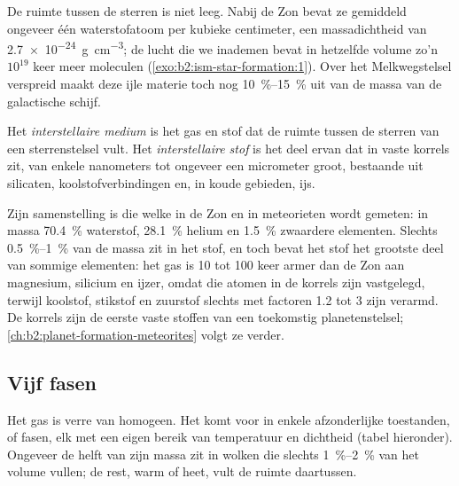 De ruimte tussen de sterren is niet leeg. Nabij de Zon bevat ze gemiddeld ongeveer
één waterstofatoom per kubieke centimeter, een massadichtheid van
\qty{2.7e-24}{g.cm^{-3}}; de lucht die we inademen bevat in hetzelfde volume zo'n $10^{19}$ keer meer
moleculen (\cref{exo:b2:ism-star-formation:1}). Over het Melkwegstelsel verspreid maakt deze ijle
materie toch nog \qtyrange{10}{15}{\percent} uit van de massa van de
galactische schijf.

\begin{definition}
\label{def:b2:ism-star-formation:ism}
Het \emph{interstellaire medium} is het gas en stof
dat de ruimte tussen de sterren van een sterrenstelsel vult. Het \emph{interstellaire
stof} is het deel ervan dat in vaste korrels zit, van enkele
nanometers tot ongeveer een micrometer groot, bestaande uit silicaten, koolstofverbindingen
en, in koude gebieden, ijs.
\end{definition}

Zijn samenstelling is die welke in de Zon en in meteorieten wordt gemeten: in massa
\qty{70.4}{\percent} waterstof, \qty{28.1}{\percent} helium en
\qty{1.5}{\percent} zwaardere elementen. Slechts \qtyrange{0.5}{1}{\percent} van de
massa zit in het stof, en toch bevat het stof het grootste deel van sommige elementen: het gas is
10 tot 100 keer armer dan de Zon aan magnesium, silicium en ijzer, omdat
die atomen in de korrels zijn vastgelegd, terwijl koolstof, stikstof en zuurstof
slechts met factoren 1.2 tot 3 zijn verarmd. De korrels zijn de eerste vaste stoffen van een
toekomstig planetenstelsel; \cref{ch:b2:planet-formation-meteorites}
volgt ze verder.

\subsection{Vijf fasen}

Het gas is verre van homogeen. Het komt voor in enkele afzonderlijke toestanden, of fasen,
elk met een eigen bereik van temperatuur en dichtheid (tabel hieronder). Ongeveer de helft
van zijn massa zit in wolken die slechts \qtyrange{1}{2}{\percent} van het volume vullen;
de rest, warm of heet, vult de ruimte daartussen.

